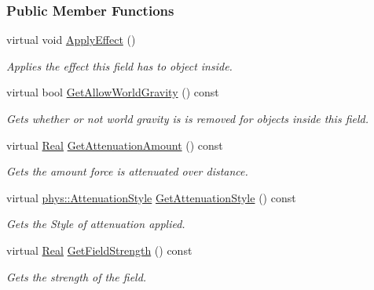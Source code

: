 \subsubsection*{Public Member Functions}
\begin{DoxyCompactItemize}
\item 
virtual void \hyperlink{classphys_1_1GravityWell_a944817d495baf9f71b6d33a420eccfde}{ApplyEffect} ()
\begin{DoxyCompactList}\small\item\em Applies the effect this field has to object inside. \item\end{DoxyCompactList}\item 
virtual bool \hyperlink{classphys_1_1GravityWell_ac79932786951304c794ff118307aa9c0}{GetAllowWorldGravity} () const 
\begin{DoxyCompactList}\small\item\em Gets whether or not world gravity is is removed for objects inside this field. \item\end{DoxyCompactList}\item 
virtual \hyperlink{namespacephys_af7eb897198d265b8e868f45240230d5f}{Real} \hyperlink{classphys_1_1GravityWell_aab54a6814742fab740132461ff424472}{GetAttenuationAmount} () const 
\begin{DoxyCompactList}\small\item\em Gets the amount force is attenuated over distance. \item\end{DoxyCompactList}\item 
virtual \hyperlink{namespacephys_ad4ce7ee5c1cc164f2ea3d5f28211739f}{phys::AttenuationStyle} \hyperlink{classphys_1_1GravityWell_abd3352779acc58e3a1e6aa1e2b495580}{GetAttenuationStyle} () const 
\begin{DoxyCompactList}\small\item\em Gets the Style of attenuation applied. \item\end{DoxyCompactList}\item 
virtual \hyperlink{namespacephys_af7eb897198d265b8e868f45240230d5f}{Real} \hyperlink{classphys_1_1GravityWell_ad8b5c7e657dbae260a65d48d45c57138}{GetFieldStrength} () const 
\begin{DoxyCompactList}\small\item\em Gets the strength of the field. \item\end{DoxyCompactList}\item 

\end{DoxyCompactItemize}
